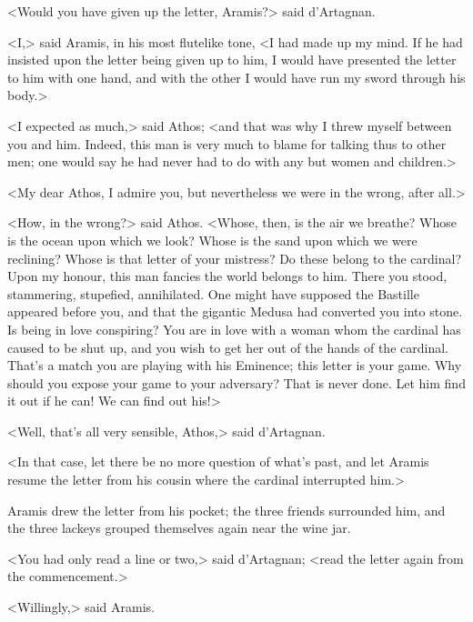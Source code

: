 <Would you have given up the letter, Aramis?> said d'Artagnan. 

<I,> said Aramis, in his most flutelike tone, <I had made up my mind. If he had insisted upon the letter being given up to him, I would have presented the letter to him with one hand, and with the other I would have run my sword through his body.> 

<I expected as much,> said Athos; <and that was why I threw myself between you and him. Indeed, this man is very much to blame for talking thus to other men; one would say he had never had to do with any but women and children.> 

<My dear Athos, I admire you, but nevertheless we were in the wrong, after all.> 

<How, in the wrong?> said Athos. <Whose, then, is the air we breathe? Whose is the ocean upon which we look? Whose is the sand upon which we were reclining? Whose is that letter of your mistress? Do these belong to the cardinal? Upon my honour, this man fancies the world belongs to him. There you stood, stammering, stupefied, annihilated. One might have supposed the Bastille appeared before you, and that the gigantic Medusa had converted you into stone. Is being in love conspiring? You are in love with a woman whom the cardinal has caused to be shut up, and you wish to get her out of the hands of the cardinal. That's a match you are playing with his Eminence; this letter is your game. Why should you expose your game to your adversary? That is never done. Let him find it out if he can! We can find out his!> 

<Well, that's all very sensible, Athos,> said d'Artagnan. 

<In that case, let there be no more question of what's past, and let Aramis resume the letter from his cousin where the cardinal interrupted him.> 

Aramis drew the letter from his pocket; the three friends surrounded him, and the three lackeys grouped themselves again near the wine jar. 

<You had only read a line or two,> said d'Artagnan; <read the letter again from the commencement.> 

<Willingly,> said Aramis. 

